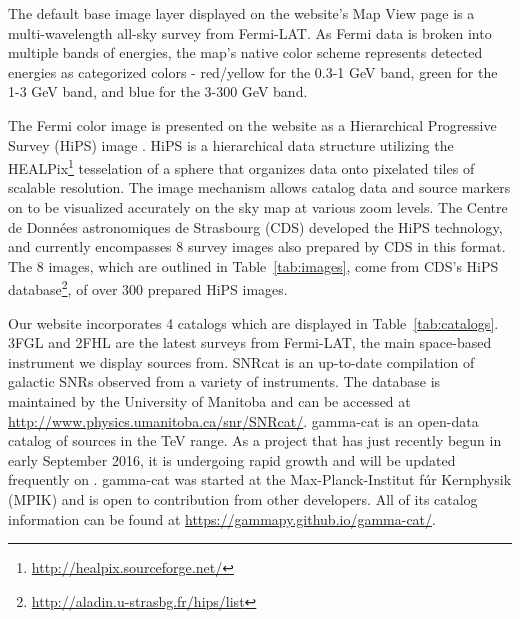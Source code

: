 %

The default base image layer displayed on the website's Map View page is a multi-wavelength all-sky survey from Fermi-LAT. As Fermi data is broken into multiple bands of energies, the map's native color scheme represents detected energies as categorized colors - red/yellow for the 0.3-1 GeV band, green for the 1-3 GeV band, and blue for the 3-300 GeV band.

 The Fermi color image is presented on the website as a Hierarchical Progressive Survey (HiPS) image \cite{hips}. HiPS is a hierarchical data structure utilizing the HEALPix\footnote[1]{\url{http://healpix.sourceforge.net/}} tesselation of a sphere that organizes data onto pixelated tiles of scalable resolution. The image mechanism allows catalog data and source markers on \gammasky to be visualized accurately on the sky map at various zoom levels. The Centre de Donn\'{e}es astronomiques de Strasbourg (CDS) developed the HiPS technology, and \gammasky currently encompasses 8 survey images also prepared by CDS in this format. The 8 images, which are outlined in Table~\ref{tab:images}, come from CDS's HiPS database\footnote[2]{\url{http://aladin.u-strasbg.fr/hips/list}}, of over 300 prepared HiPS images.

Our website incorporates 4 catalogs which are displayed in Table~\ref{tab:catalogs}. 3FGL \cite{3fgl} and 2FHL \cite{2fhl} are the latest surveys from Fermi-LAT, the main space-based instrument we display sources from. SNRcat \cite{snrcat} is an up-to-date compilation of galactic SNRs observed from a variety of instruments. The database is maintained by the University of Manitoba and can be accessed at \url{http://www.physics.umanitoba.ca/snr/SNRcat/}. gamma-cat is an open-data catalog of sources in the TeV range. As a project that has just recently begun in early September 2016, it is undergoing rapid growth and will be updated frequently on \gammasky. gamma-cat was started at the Max-Planck-Institut f\'{u}r Kernphysik (MPIK) and is open to contribution from other developers. All of its catalog information can be found at \url{https://gammapy.github.io/gamma-cat/}.

